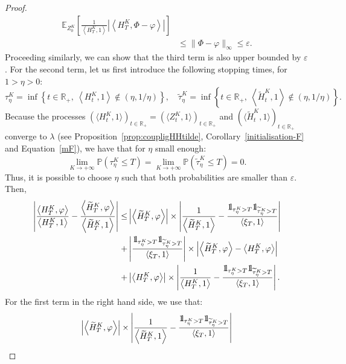 \documentclass[AHL,Unicode,longabstracts,published]{cedram}
\renewcommand*\P{\mathbb{P}}
\newcommand*\R{\mathbb{R}}
\newcommand*\E{\mathbb{E}}
\newcommand*\ind{{\mathchoice {\rm 1\mskip-4mu l} {\rm 1\mskip-4mu l} {\rm 1\mskip-4.5mu l} {\rm 1\mskip-5mu l}}}
\begin{document}
\begin{proof}
\begin{align*}
\E_{Z^K_0}\left[\frac{1}{\left\langle H^K_T,1\right\rangle} \left| \left\langle H^K_T,\Phi-\varphi\right\rangle\right|\right]\\
&\leq \|\Phi-\varphi\|_\infty \leq \varepsilon.
\end{align*}
Proceeding similarly, we can show that the third term is also upper bounded by $\varepsilon$. For the second term, let us first introduce the following stopping times, for ${1>}\eta>0$:
\[
\tau^K_\eta=\inf\left\{t\in \R_+,\ \left\langle H^K_t,1\right\rangle \notin (\eta,1/\eta)\right\},\quad
\widetilde{\tau}^K_\eta=\inf\left\{t\in \R_+,\ \left\langle \widetilde{H}^K_t,1\right\rangle \notin (\eta,1/\eta)\right\}.
\]
Because the processes $(\langle H^K_t,1\rangle)_{t \in \R_+}=(\langle Z^K_t,1\rangle)_{t \in \R_+}$ and $(\langle \widetilde{H}^K_t,1\rangle)_{t \in \R_+}$ converge {to $\lambda$ (see Proposition~\ref{prop:coupligHHtilde}, Corollary~\ref{initialisation-F} and Equation~\eqref{mF})}, we have that for $\eta$ small enough:
\[
\lim_{K\rightarrow +\infty}\P\left(\tau^K_\eta\leq T\right)=\lim_{K \rightarrow +\infty}\P\left(\widetilde{\tau}^K_\eta\leq T\right)=0.
\]
Thus, it is possible to choose $\eta$ such that both probabilities are smaller than $\varepsilon$. Then,
\begin{align*}
\left| \frac{\left\langle H^K_T,\varphi\right\rangle}{\left\langle H^K_T,1\right\rangle}-\frac{\left\langle \widetilde{H}^K_T,\varphi\right\rangle}{\left\langle \widetilde{H}^K_T,1\right\rangle}\right| \leq &
\left|\left\langle \widetilde{H}^K_T,\varphi\right\rangle \right| \times \left|\frac{1}{\left\langle \widetilde{H}^K_T,1\right\rangle }- \frac{\ind_{\tau^K_\eta > T}\ind_{\widetilde{\tau}^K_\eta > T}}{\left\langle \xi_T,1\right\rangle }\right|\\
+ & \left|\frac{\ind_{\tau^K_\eta > T}\ind_{\widetilde{\tau}^K_\eta > T}}{\left\langle \xi_T,1\right\rangle}\right| \times \left|\left\langle \widetilde{H}^K_T,\varphi\right\rangle - \left\langle H^K_T,\varphi\right\rangle \right|\\
+ & \left|\left\langle H^K_T,\varphi\right\rangle \right| \times \left|\frac{1}{\left\langle {H}^K_T,1\right\rangle }- \frac{\ind_{\tau^K_\eta > T}\ind_{\widetilde{\tau}^K_\eta > T}}{\left\langle \xi_T,1\right\rangle }\right|.
\end{align*}
For the first term in the right hand side, we use that:
\begin{multline*}
\left|\left\langle \widetilde{H}^K_T,\varphi\right\rangle \right| \times \left|\frac{1}{\left\langle \widetilde{H}^K_T,1\right\rangle }- \frac{\ind_{\tau^K_\eta > T}\ind_{\widetilde{\tau}^K_\eta > T}}{\left\langle \xi_T,1\right\rangle}\right|\\

\end{multline*}
\end{proof}
\end{document}
